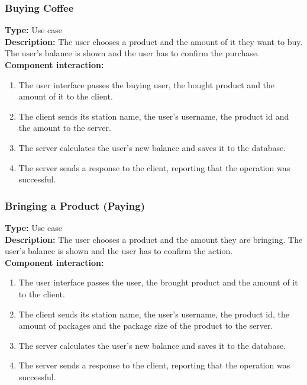 \documentclass[11pt]{article}
\begin{document}
\subsubsection{Buying Coffee}
\textbf{Type:} Use case\\
\textbf{Description:} The user chooses a product and the amount of it they want to buy. 
The user's balance is shown and the user has to confirm the purchase.\\
\textbf{Component interaction:}
\begin{enumerate} 
\item{The user interface passes the buying user, the bought product and the amount of it to the client.}
\item{The client sends its station name, the user's username, the product id and the amount to the server.}
\item{The server calculates the user's new balance and saves it to the database.}
\item{The server sends a response to the client, reporting that the operation was successful.}
\end{enumerate}

\subsubsection{Bringing a Product (Paying)}
\textbf{Type:} Use case\\
\textbf{Description:} The user chooses a product and the amount they are bringing. 
The user's balance is shown and the user has to confirm the action.\\
\textbf{Component interaction:}
\begin{enumerate} 
\item{The user interface passes the user, the brought product and the amount of it to the client.}
\item{The client sends its station name, the user's username, the product id, the amount of packages and the package size of the product to the server.}
\item{The server calculates the user's new balance and saves it to the database.}
\item{The server sends a response to the client, reporting that the operation was successful.}
\end{enumerate}
\end{document}
